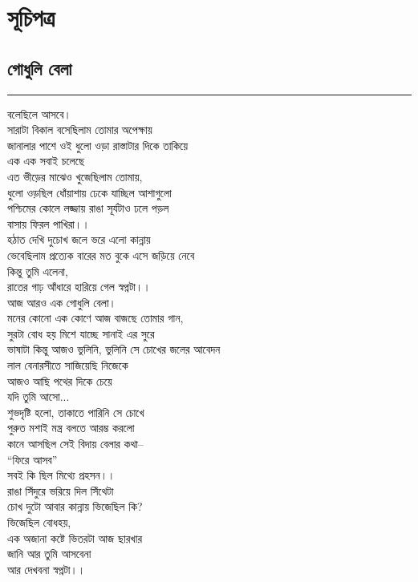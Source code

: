 \documentclass[12pt]{article}
\begin{document}
\section*{সূচিপত্র }
\newpage

\subsection*{গোধুলি বেলা }
\hrule
\vspace{0.5in}
বলেছিলে আসবে।\\
সারাটা বিকাল বসেছিলাম তোমার অপেক্ষায়\\
জানালার পাশে ওই ধুলো ওড়া রাস্তাটার দিকে তাকিয়ে\\
এক এক সবাই চলেছে\\
এত ভীড়ের মাঝেও খুজেছিলাম তোমায়,\\
ধুলো ওড়ছিল ধোঁয়াশায় ঢেকে যাচ্ছিল আশাগুলো\\
পশ্চিমের কোলে লজ্জায় রাঙা সূর্যটাও ঢলে পড়ল\\
বাসায় ফিরল পাখিরা।।\\
হঠাত দেখি দুচোখ জলে ভরে এলো কান্নায়\\
ভেবেছিলাম প্রত্যেক বারের মত বুকে এসে জড়িয়ে নেবে\\
কিন্তু তুমি এলেনা,\\
রাতের গাঢ় আঁধারে হারিয়ে গেল স্বপ্নটা।।\\

\noindent
আজ আরও এক গোধুলি বেলা।\\
মনের কোনো এক কোণে আজ বাজছে তোমার গান,\\
সুরটা বোধ হয় মিশে যাচ্ছে সানাই এর সুরে\\
ভাষাটা কিন্তু আজও ভুলিনি, ভুলিনি সে চোখের জলের আবেদন\\
লাল বেনারসীতে সাজিয়েছি নিজেকে\\
আজও আছি পথের দিকে চেয়ে\\
যদি তুমি আসো...\\

\noindent
শুভদৃষ্টি হলো, তাকাতে পারিনি সে চোখে\\
পুরুত মশাই মন্ত্র বলতে আরম্ভ করলো\\
কানে আসছিল সেই বিদায় বেলার কথা--\\
``ফিরে আসব''\\
সবই কি ছিল মিথ্যে প্রহসন।।\\
রাঙা সিঁদুরে ভরিয়ে দিল সিঁথেটা\\
চোখ দুটো আবার কান্নায় ভিজেছিল কি?\\
ভিজেছিল বোধহয়,\\

\noindent
এক অজানা কষ্টে ভিতরটা আজ ছারখার\\
জানি আর তুমি আসবেনা\\
আর দেখবনা স্বপ্নটা।।   \\
\newpage
\end{document}
